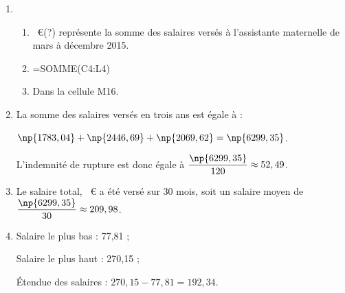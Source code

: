 \begin{enumerate}
\item 
	\begin{enumerate}
		\item %
~\euro (?) représente la somme des salaires versés à l'assistante maternelle de mars à décembre 2015.
		\item %
=SOMME(C4:\;L4)
		\item %
Dans la cellule M16.
	\end{enumerate}
\item %
La somme des salaires versés en trois ans est égale à :

$\np{1783,04} + \np{2446,69} + \np{2069,62} = \np{6299,35}$.

L'indemnité de rupture est donc égale à $\dfrac{\np{6299,35}}{120} \approx 52,49$.
\item %
Le salaire total,  ~\euro{} a été versé sur 30 mois, soit un salaire moyen de $\dfrac{\np{6299,35}}{30} \approx 209,98$.
\item %
Salaire le plus bas : 77,81 ;

Salaire le plus haut : 270,15 ;

Étendue des salaires : $270,15 - 77,81 = 192,34$.
\end{enumerate}

\bigskip

